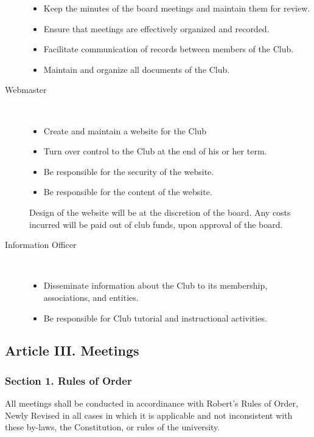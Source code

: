 \documentclass{article}
\begin{document}
\begin{description}
          \vspace{-12pt}
          \begin{itemize}
            \item Keep the minutes of the board meetings and maintain them for review.
            \item Ensure that meetings are effectively organized and recorded.
            \item Facilitate communication of records between members of the Club.
            \item Maintain and organize all documents of the Club.
          \end{itemize}
        \item[Webmaster] ~\\
          \vspace{-12pt}
          \begin{itemize}
            \item Create and maintain a website for the Club
            \item Turn over control to the Club at the end of his or her term.
            \item Be responsible for the security of the website.
            \item Be responsible for the content of the website.
          \end{itemize}

          Design of the website will be at the discretion of the board. Any costs incurred will be paid out of club funds, upon approval of the board.

        \item[Information Officer] ~\\
          \vspace{-12pt}
          \begin{itemize}
            \item Disseminate information about the Club to its membership, associations, and entities.
            \item Be responsible for Club tutorial and instructional activities.
          \end{itemize}
        \end{description}

  \subsection{Article III. Meetings}

    \subsubsection{Section 1. Rules of Order}
      All meetings shall be conducted in accordinance with Robert's Rules of Order, Newly Revised in all cases in which it is applicable and not inconsistent with these by-laws, the Constitution, or rules of the university.
\end{document}
